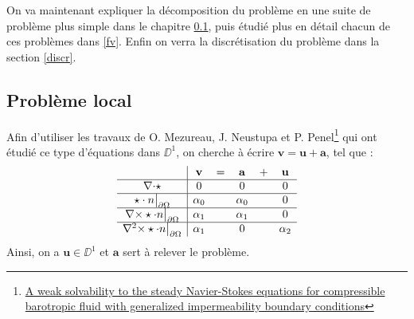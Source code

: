 On va maintenant expliquer la décomposition du problème en une suite de problème plus simple dans le chapitre \ref{local}, puis étudié plus en détail chacun de ces problèmes dans \ref{fv}. Enfin on verra la discrétisation du problème dans la section \ref{discr}.

\subsection{Problème local}
\label{local}

Afin d'utiliser les travaux de O. Mezureau, J. Neustupa et P. Penel\footnote{\href{http://www.researchgate.net/publication/254219219\_A\_weak\_solvability\_to\_the\_steady\_NavierStokes\_equations\_for\_compressible\_barotropic\_fluid\_with\_generalized\_impermeability\_boundary\_conditions}{A weak solvability to the steady Navier-Stokes equations for compressible barotropic fluid with generalized impermeability boundary conditions}} qui ont étudié ce type d'équations dans $\DD^1$, on cherche à écrire $\mathbf{v}=\mathbf{u}+\mathbf{a}$, tel que :\\
\begin{equation}
\label{v}
\begin{array}{c|ccccc}
& \mathbf{v} & = & \mathbf{a} & + & \mathbf{u}\\ \hline
{\nabla\cdot}\star & 0 & & 0 & & 0\\ \hline
\star\cdot n{\big\rvert_{\partial\Omega}} & \alpha_0 & & \alpha_0 & & 0\\ \hline
{\nabla\times}\star\cdot n{\big\rvert_{\partial\Omega}} & \alpha_1 & & \alpha_1 & & 0\\ \hline
{\nabla^2\times}\star\cdot n{\big\rvert_{\partial\Omega}} & \alpha_1 & & 0 & & \alpha_2
\end{array}
\end{equation}
Ainsi, on a $\mathbf{u}\in\DD^1$ et $\mathbf{a}$ sert à relever le problème.

